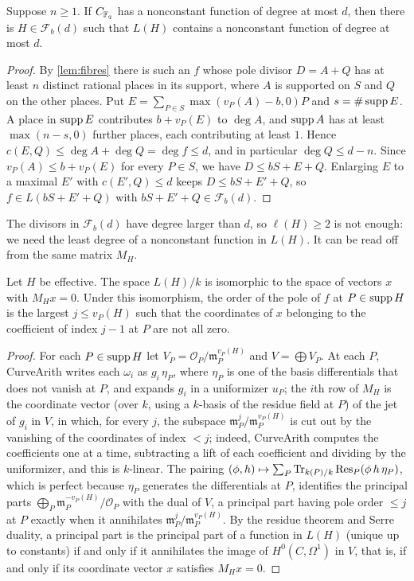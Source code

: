 \begin{proposition}\label{prop:covers}
Suppose $n\ge1$. If $C_{\mathbb{F}_q}$ has a nonconstant function of degree at most $d$, then there is
$H\in\mathcal F_b(d)$ such that $L(H)$ contains a nonconstant function of degree at most $d$.
\end{proposition}
\begin{proof}
By \cref{lem:fibres} there is such an $f$ whose pole divisor $D=A+Q$ has at least $n$ distinct rational
places in its support, where $A$ is supported on $S$ and $Q$ on the other places. Put
$E=\sum_{P\in S}\max(v_P(A)-b,0)P$ and $s=\#\operatorname{supp} E$. A place in $\operatorname{supp} E$ contributes $b+v_P(E)$ to $\deg A$,
and $\operatorname{supp} A$ has at least $\max(n-s,0)$ further places, each contributing at least $1$. Hence
$c(E,Q)\le\deg A+\deg Q=\deg f\le d$, and in particular $\deg Q\le d-n$. Since $v_P(A)\le b+v_P(E)$ for every
$P\in S$, we have $D\le bS+E+Q$. Enlarging $E$ to a maximal $E'$ with $c(E',Q)\le d$ keeps
$D\le bS+E'+Q$, so $f\in L(bS+E'+Q)$ with $bS+E'+Q\in\mathcal F_b(d)$.
\end{proof}

The divisors in $\mathcal F_b(d)$ have degree larger than $d$, so $\ell(H)\ge2$ is not enough: we need the
least degree of a nonconstant function in $L(H)$. It can be read off from the same matrix $M_H$.

\begin{lemma}\label{lem:kernel}
Let $H$ be effective. The space $L(H)/k$ is isomorphic to the space of vectors $x$ with $M_Hx=0$. Under this
isomorphism, the order of the pole of $f$ at $P\in\operatorname{supp} H$ is the largest $j\le v_P(H)$ such that the
coordinates of $x$ belonging to the coefficient of index $j-1$ at $P$ are not all zero.
\end{lemma}
\begin{proof}
For each $P\in\operatorname{supp} H$ let $V_P=\mathcal O_P/\mathfrak m_P^{v_P(H)}$ and $V=\bigoplus V_P$. At each $P$,
CurveArith writes each $\omega_i$ as $g_i\,\eta_P$, where $\eta_P$ is one of the basis differentials that does not vanish at
$P$, and expands $g_i$ in a uniformizer $u_P$; the $i$th row of
$M_H$ is the coordinate vector (over $k$, using a $k$-basis of the residue field at $P$) of the jet of $g_i$ in
$V$, in which, for every $j$, the subspace $\mathfrak m_P^j/\mathfrak m_P^{v_P(H)}$
is cut out by the vanishing of the coordinates of index $<j$; indeed, CurveArith computes the coefficients
one at a time, subtracting a lift of each coefficient and dividing by the uniformizer, and this is
$k$-linear. The pairing $(\phi,h)\mapsto\sum_P\operatorname{Tr}_{k(P)/k}\operatorname{Res}_P(\phi\,h\,\eta_P)$, which is perfect because
$\eta_P$ generates the differentials at $P$, identifies the principal parts $\bigoplus_P\mathfrak m_P^{-v_P(H)}/\mathcal O_P$
with the dual of $V$, a principal part having pole order $\le j$ at $P$ exactly when it annihilates
$\mathfrak m_P^{j}/\mathfrak m_P^{v_P(H)}$. By the residue theorem and Serre duality, a principal part is
the principal part of a function in $L(H)$ (unique up to constants) if and only if it annihilates the image
of $H^0(C,\Omega^1)$ in $V$, that is, if and only if its coordinate vector $x$ satisfies $M_Hx=0$.
\end{proof}

